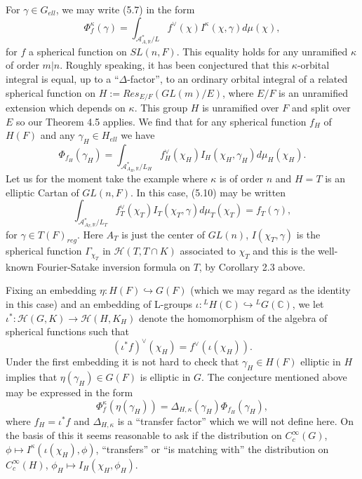 \documentclass[12pt]{article}
\begin{document}
For $\gamma\in G_{ell}$, we may write (5.7) in the form
\begin{equation}\tag{5.9}
\Phi^\kappa_f(\gamma)=\int_{\mathcal{A}^*_{A,\mathbb{R}}/L}f^\vee(\chi)I^\kappa(\chi,\gamma)d\mu(\chi),
\end{equation}
for $f$ a spherical function on $SL(n,F)$. This equality holds for any unramified $\kappa$ of order $m|n$. Roughly speaking, it has been conjectured that this $\kappa$-orbital integral is equal, up to a ``$\Delta$-factor'', to an ordinary orbital integral of a related spherical function on $H:=Res_{E/F}(GL(m)/E)$, where $E/F$ is an unramified extension which depends on $\kappa$. This group $H$ is unramified over $F$ and split over $E$ so our Theorem 4.5 applies. We find that for any spherical function $f_H$ of $H(F)$ and any $\gamma_H\in H_{ell}$ we have
\begin{equation}\tag{5.10}
\Phi_{f_H}(\gamma_H)=\int_{\mathcal{A}^*_{A_H,\mathbb{R}}/L_H}f^\vee_H(\chi_H)I_H(\chi_H,\gamma_H)d\mu_H(\chi_H).
\end{equation}
Let us for the moment take the example where $\kappa$ is of order $n$ and $H=T$ is an elliptic Cartan of $GL(n,F)$. In this case, (5.10) may be written
\[
\int_{\mathcal{A}^*_{A_T,\mathbb{R}}/L_T}f^\vee_T(\chi_T)I_T(\chi_T,\gamma)d\mu_T(\chi_T)=f_T(\gamma),
\]
for $\gamma\in T(F)_{reg}$. Here $A_T$ is just the center of $GL(n)$, $I(\chi_T,\gamma)$ is the spherical function $\Gamma_{\chi_T}$ in $\mathcal{H}(T,T\cap K)$ associated to $\chi_T$ and this is the well-known Fourier-Satake inversion formula on $T$, by Corollary 2.3 above.

Fixing an embedding $\eta:H(F)\hookrightarrow G(F)$ (which we may regard as the identity in this case) and an embedding of L-groups $\iota:{}^LH(\mathbb{C})\hookrightarrow{}^LG(\mathbb{C})$, we let $\iota^*:\mathcal{H}(G,K)\rightarrow\mathcal{H}(H,K_H)$ denote the homomorphism of the algebra of spherical functions such that
\[
(\iota^*f)^\vee(\chi_H)=f^\vee(\iota(\chi_H)).
\]
Under the first embedding it is not hard to check that $\gamma_H\in H(F)$ elliptic in $H$ implies that $\eta(\gamma_H)\in G(F)$ is elliptic in $G$. The conjecture mentioned above may be expressed in the form
\begin{equation}\tag{5.11}
\Phi^\kappa_f(\eta(\gamma_H))=\Delta_{H,\kappa}(\gamma_H)\Phi_{f_H}(\gamma_H),
\end{equation}
where $f_H=\iota^*f$ and $\Delta_{H,\kappa}$ is a ``transfer factor'' which we will not define here. On the basis of this it seems reasonable to ask if the distribution on $C_c^\infty(G)$, $\phi\longmapsto I^\kappa(\iota(\chi_H),\phi)$, ``transfers'' or ``is matching with'' the distribution on $C_c^\infty(H)$, $\phi_H\longmapsto I_H(\chi_H,\phi_H)$.
\end{document}
